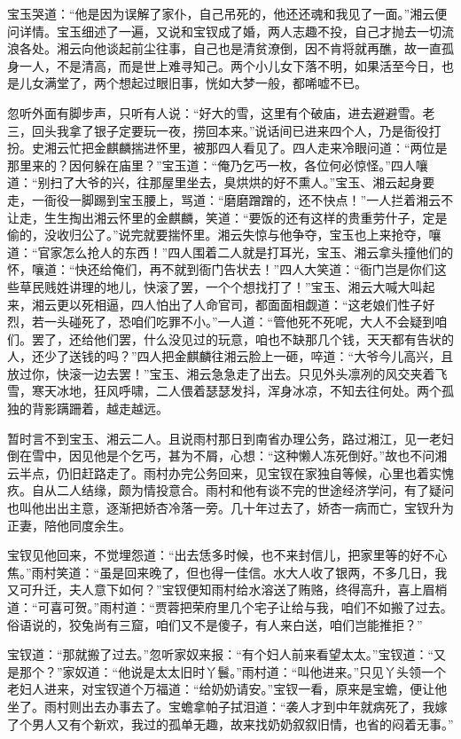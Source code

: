 \documentclass[12pt,oneside]{book}
\begin{document}
宝玉哭道：“他是因为误解了家仆，自己吊死的，他还还魂和我见了一面。”湘云便问详情。宝玉细述了一遍，又说和宝钗成了婚，两人志趣不投，自己才抛去一切流浪各处。湘云向他谈起前尘往事，自己也是清贫潦倒，因不肯将就再醮，故一直孤身一人，不是清高，而是世上难寻知己。两个小儿女下落不明，如果活至今日，也是儿女满堂了，两个想起过眼旧事，恍如大梦一般，都唏嘘不已。

忽听外面有脚步声，只听有人说：“好大的雪，这里有个破庙，进去避避雪。老三，回头我拿了银子定要玩一夜，捞回本来。”说话间已进来四个人，乃是衙役打扮。史湘云忙把金麒麟揣进怀里，被那四人看见了。四人走来冷眼问道：“两位是那里来的？因何躲在庙里？”宝玉道：“俺乃乞丐一枚，各位何必惊怪。”四人嚷道：“别扫了大爷的兴，往那屋里坐去，臭烘烘的好不熏人。”宝玉、湘云起身要走，一衙役一脚踢到宝玉腰上，骂道：“磨磨蹭蹭的，还不快点！”一人拦着湘云不让走，生生掏出湘云怀里的金麒麟，笑道：“要饭的还有这样的贵重劳什子，定是偷的，没收归公了。”说完就要揣怀里。湘云失惊与他争夺，宝玉也上来抢夺，嚷道：“官家怎么抢人的东西！”四人围着二人就是打耳光，宝玉、湘云拿头撞他们的怀，嚷道：“快还给俺们，再不就到衙门告状去！”四人大笑道：“衙门岂是你们这些草民贱姓讲理的地儿，快滚了罢，一个个想找打了！”宝玉、湘云大喊大叫起来，湘云更以死相逼，四人怕出了人命官司，都面面相觑道：“这老娘们性子好烈，若一头碰死了，恐咱们吃罪不小。”一人道：“管他死不死呢，大人不会疑到咱们。罢了，还给他们罢，什么没见过的玩意，咱也不缺那几个钱，天天都有告状的人，还少了送钱的吗？”四人把金麒麟往湘云脸上一砸，啐道：“大爷今儿高兴，且放过你，快滚一边去罢！”宝玉、湘云急急走了出去。只见外头凛冽的风交夹着飞雪，寒天冰地，狂风呼啸，二人偎着瑟瑟发抖，浑身冰凉，不知去往何处。两个孤独的背影蹒跚着，越走越远。

暂时言不到宝玉、湘云二人。且说雨村那日到南省办理公务，路过湘江，见一老妇倒在雪中，因见他是个乞丐，甚为不屑，心想：“这种懒人冻死倒好。”故也不问湘云半点，仍旧赶路走了。雨村办完公务回来，见宝钗在家独自等候，心里也着实愧疚。自从二人结缘，颇为情投意合。雨村和他有谈不完的世途经济学问，有了疑问也叫他出出主意，逐渐把娇杏冷落一旁。几十年过去了，娇杏一病而亡，宝钗升为正妻，陪他同度余生。

宝钗见他回来，不觉埋怨道：“出去恁多时候，也不来封信儿，把家里等的好不心焦。”雨村笑道：“虽是回来晚了，但也得一佳信。水大人收了银两，不多几日，我又可升迁，夫人意下如何？”宝钗便知雨村给水溶送了贿赂，终得高升，喜上眉梢道：“可喜可贺。”雨村道：“贾蓉把荣府里几个宅子让给与我，咱们不如搬了过去。俗语说的，狡兔尚有三窟，咱们又不是傻子，有人来白送，咱们岂能推拒？”

宝钗道：“那就搬了过去。”忽听家奴来报：“有个妇人前来看望太太。”宝钗道：“又是那个？”家奴道：“他说是太太旧时丫鬟。”雨村道：“叫他进来。”只见丫头领一个老妇人进来，对宝钗道个万福道：“给奶奶请安。”宝钗一看，原来是宝蟾，便让他坐了。雨村则出去办事去了。宝蟾拿帕子拭泪道：“袭人才到中年就病死了，我嫁了个男人又有个新欢，我过的孤单无趣，故来找奶奶叙叙旧情，也省的闷着无事。”
\end{document}
